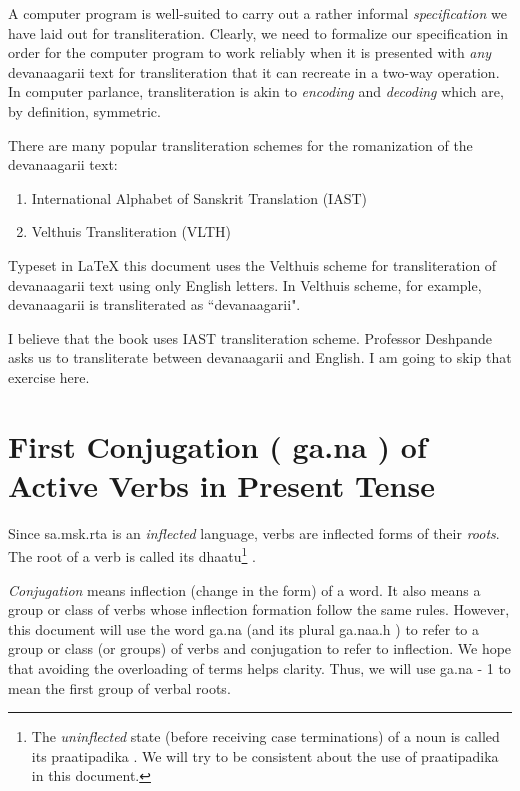 \documentclass[a4paper, 12pt]{article}
\newcommand \eng[1]{
    \textenglish{#1}
}
\newcommand \sans[1]{
    \textsanskrit{#1}
}
\begin{document}
A computer program is well-suited to carry out a rather informal \emph{specification} we have laid out for transliteration. Clearly, we need to formalize our specification in order for the computer program to work reliably when it is presented with \emph{any} \sans{devanaagarii} text for transliteration that it can recreate in a two-way operation. In computer parlance, transliteration is akin to \emph{encoding} and \emph{decoding} which are, by definition, symmetric.

There are many popular transliteration schemes for the romanization of the \sans{devanaagarii} text:
\begin{enumerate}
    \item International Alphabet of Sanskrit Translation (IAST) \cite{iast}
    \item Velthuis Transliteration (VLTH) \cite{velthuis}
\end{enumerate}

Typeset in {\LaTeX} this document uses the Velthuis scheme for transliteration of \sans{devanaagarii} text using only English letters. In Velthuis scheme, for example, \sans{devanaagarii} is transliterated as ``devanaagarii".

I believe that the book uses IAST transliteration scheme. Professor Deshpande asks us to transliterate between \sans{devanaagarii} and English. I am going to skip that exercise here.

\newpage

\section{First Conjugation (\sans{ga.na}) of Active Verbs in Present Tense}

Since \sans{sa.msk.rta} is an \emph{inflected} language, verbs are inflected forms of their \emph{roots}. The root of a verb is called its \sans{dhaatu\footnote{\eng{The \emph{uninflected} state (before receiving case terminations) of a noun is called its \sans{praatipadika}. We will try to be consistent about the use of \sans{praatipadika} in this document.}}}. 

\emph{Conjugation} means inflection (change in the form) of a word. It also means a group or class of verbs whose inflection formation follow the same rules. However, this document will use the word \sans{ga.na} (and its plural \sans{ga.naa.h}) to refer to a group or class (or groups) of verbs and conjugation to refer to inflection. We hope that avoiding the overloading of terms helps clarity. Thus, we will use \sans{ga.na - 1} to mean the first group of verbal roots.
\end{document}
